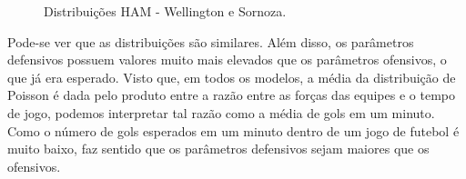 \begin{figure}
    \caption{Distribuições HAM - Wellington e Sornoza.}
    \label{plots2}
\end{figure}

Pode-se ver que as distribuições são similares. Além disso, os parâmetros defensivos possuem valores muito mais elevados que os parâmetros ofensivos, o que já era esperado. Visto que, em todos os modelos, a média da distribuição de Poisson é dada pelo produto entre a razão entre as forças das equipes e o tempo de jogo, podemos interpretar tal razão como a média de gols em um minuto. Como o número de gols esperados em um minuto dentro de um jogo de futebol é muito baixo, faz sentido que os parâmetros defensivos sejam maiores que os ofensivos.


